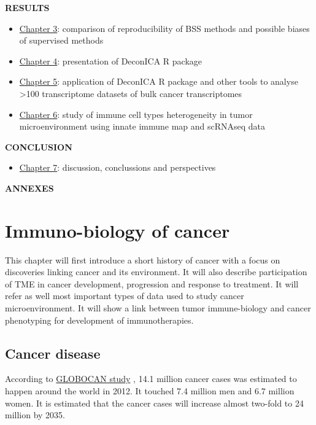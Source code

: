 \documentclass[12pt,]{book}
\providecommand{\tightlist}{%
  \setlength{\itemsep}{0pt}\setlength{\parskip}{0pt}}
\theoremstyle{definition}
\theoremstyle{definition}
\theoremstyle{definition}
\theoremstyle{remark}
\begin{document}
\textbf{RESULTS}

\begin{itemize}
\item
  \protect\hyperlink{sens}{Chapter 3}: comparison of reproducibility of
  BSS methods and possible biases of supervised methods
\item
  \protect\hyperlink{deconica}{Chapter 4}: presentation of DeconICA R
  package
\item
  \protect\hyperlink{results}{Chapter 5}: application of DeconICA R
  package and other tools to analyse \textgreater{}100 transcriptome
  datasets of bulk cancer transcriptomes
\item
  \protect\hyperlink{map}{Chapter 6}: study of immune cell types
  heterogeneity in tumor microenvironment using innate immune map and
  scRNAseq data
\end{itemize}

\textbf{CONCLUSION}

\begin{itemize}
\tightlist
\item
  \protect\hyperlink{conclusions}{Chapter 7}: discussion, conclussions
  and perspectives
\end{itemize}

\textbf{ANNEXES}

\hypertarget{intro}{%
\chapter{Immuno-biology of cancer}\label{intro}}

This chapter will first introduce a short history of cancer with a focus
on discoveries linking cancer and its environment. It will also describe
participation of TME in cancer development, progression and response to
treatment. It will refer as well most important types of data used to
study cancer microenvironment. It will show a link between tumor
immune-biology and cancer phenotyping for development of
immunotherapies.

\hypertarget{cancer-disease}{%
\section{Cancer disease}\label{cancer-disease}}

According to
\href{http://globocan.iarc.fr/Pages/fact_sheets_cancer.aspx}{GLOBOCAN
study} \citep{GLOBOCAN}, 14.1 million cancer cases was estimated to
happen around the world in 2012. It touched 7.4 million men and 6.7
million women. It is estimated that the cancer cases will increase
almost two-fold to 24 million by 2035.
\end{document}
